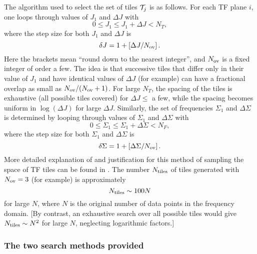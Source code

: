 The algorithm used to select the set of tiles ${\cal T}_j$ is as
follows.  For each TF plane $i$, one loops through values of $J_1$
and $\Delta J$ with
\begin{equation}
0 \le J_1 \le J_1 + \Delta J < N_T,
\end{equation}
where the step size for both $J_1$ and $\Delta J$ is
\begin{equation}
\delta J = 1 + \left[\Delta J / N_{\rm ov} \right].
\end{equation}
Here the brackets mean ``round down to the nearest integer'', and
$N_{\rm ov}$ is a fixed integer of order a few.  The idea is that
successive tiles that differ only in their value of $J_1$ and have
identical values of $\Delta J$ (for example) can have a fractional
overlap as small as $N_{\rm ov} / (N_{\rm ov} + 1)$.  For large $N_T$,
the spacing of the tiles is exhaustive (all possible tiles covered)
for $\Delta J \le $ a few, while the spacing becomes uniform in $\log
(\Delta J)$ for large $\Delta J$.  Similarly, the set of frequencies
$\Sigma_1$ and $\Delta \Sigma$ is determined by 
looping through values of $\Sigma_1$
and $\Delta \Sigma$ with
\begin{equation}
0 \le \Sigma_1 \le \Sigma_1 + \Delta \Sigma < N_F,
\end{equation}
where the step size for both $\Sigma_1$ and $\Delta \Sigma$ is
\begin{equation}
\delta \Sigma = 1 + \left[\Delta \Sigma / N_{\rm ov} \right].
\end{equation}
More detailed explanation of and justification for this method of
sampling the space of TF tiles can be found in \cite{abcf:2000}.
The number $N_{\rm tiles}$ of tiles generated with $N_{\rm ov}=3$ (for
example) is
approximately 
\begin{equation}
N_{\rm tiles} \sim 100 N
\end{equation}
for large $N$, where $N$ is the original number of data points in the
frequency domain.  [By
contrast, an exhaustive search over all possible tiles would give
$N_{\rm tiles} \sim N^2$ for large $N$, neglecting logarithmic factors.]


\subsubsection{The two search methods provided}
\label{twomethods}

